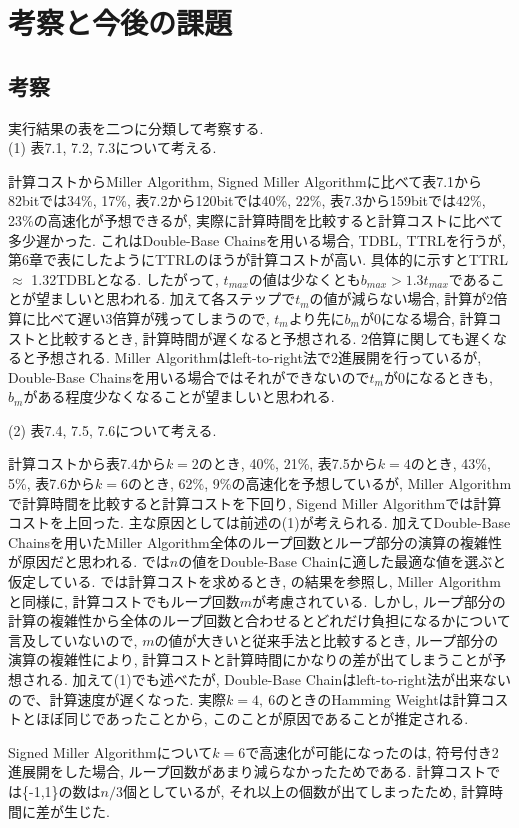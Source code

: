 \chapter{考察と今後の課題}
\section{考察}
実行結果の表を二つに分類して考察する.\\

\noindent (1) 表7.1, 7.2, 7.3について考える. \\
\par
計算コストからMiller Algorithm, Signed Miller Algorithmに比べて表7.1から82bitでは34\%, 17\%, 表7.2から120bitでは40\%, 22\%, 表7.3から159bitでは42\%, 23\%の高速化が予想できるが, 実際に計算時間を比較すると計算コストに比べて多少遅かった. これはDouble-Base Chainsを用いる場合, TDBL, TTRLを行うが, 第6章で表にしたようにTTRLのほうが計算コストが高い. 具体的に示すとTTRL $\approx$ 1.32TDBLとなる. したがって, $t_{max}$の値は少なくとも$b_{max} > 1.3t_{max}$であることが望ましいと思われる. 加えて各ステップで$t_m$の値が減らない場合, 計算が2倍算に比べて遅い3倍算が残ってしまうので, $t_m$より先に$b_m$が0になる場合, 計算コストと比較するとき, 計算時間が遅くなると予想される. 2倍算に関しても遅くなると予想される. Miller Algorithmはleft-to-right法で2進展開を行っているが, Double-Base Chainsを用いる場合ではそれができないので$t_m$が0になるときも, $b_m$がある程度少なくなることが望ましいと思われる. \\

\bigskip

\noindent (2) 表7.4, 7.5, 7.6について考える. \\
\par
計算コストから表7.4から$k=2$のとき, 40\%, 21\%, 表7.5から$k=4$のとき, 43\%, 5\%, 表7.6から$k=6$のとき, 62\%, 9\%の高速化を予想しているが, Miller Algorithmで計算時間を比較すると計算コストを下回り, Sigend Miller Algorithmでは計算コストを上回った. 主な原因としては前述の(1)が考えられる. 加えてDouble-Base Chainsを用いたMiller Algorithm全体のループ回数とループ部分の演算の複雑性が原因だと思われる. \cite{DBNS}では$n$の値をDouble-Base Chainに適した最適な値を選ぶと仮定している. \cite{DBCT}では計算コストを求めるとき, \cite{DBNS}の結果を参照し, Miller Algorithmと同様に, 計算コストでもループ回数$m$が考慮されている. しかし, ループ部分の計算の複雑性から全体のループ回数と合わせるとどれだけ負担になるかについて言及していないので, $m$の値が大きいと従来手法と比較するとき, ループ部分の演算の複雑性により, 計算コストと計算時間にかなりの差が出てしまうことが予想される. 加えて(1)でも述べたが, Double-Base Chainはleft-to-right法が出来ないので、計算速度が遅くなった. 実際$k=4,\ 6$のときのHamming Weightは計算コストとほぼ同じであったことから, このことが原因であることが推定される. 
\par
Signed Miller Algorithmについて$k=6$で高速化が可能になったのは, 符号付き2進展開をした場合, ループ回数があまり減らなかったためである. 計算コストでは\{-1,1\}の数は$n/3$個としているが, それ以上の個数が出てしまったため, 計算時間に差が生じた. 
